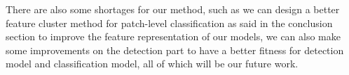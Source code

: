 \documentclass[journal,twoside,web]{ieeecolor}
\begin{document}
There are also some shortages for our method, such as we can design a better feature cluster method for patch-level classification as said in the conclusion section to improve the feature representation of our models, we can also make some improvements on the detection part to have a better fitness for detection model and classification model, all of which will be our future work.


\end{document}
